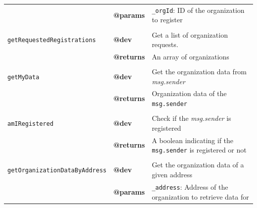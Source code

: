 \begin{table}[H]
{\begin{tabular}{lll}
                          & \textbf{@params}           & \texttt{\_orgId}: ID of the organization to register                                                                     \\
                          &                   &                                                                                                                \\ \hline
\texttt{getRequestedRegistrations} & \textbf{@dev}              & Get a list of organization requests.                                                                           \\
                          & \textbf{@returns}           & An array of organizations                                                                                          \\
                          &                   &                                                                                                                \\ \hline
\texttt{getMyData} &      \textbf{@dev}        & Get the organization data from \textit{msg.sender}                                                           \\
                          & \textbf{@returns}           & Organization data of the \texttt{msg.sender}                                                                     \\
                          &                   &                                                                                                                \\ \hline
\texttt{amIRegistered} &        \textbf{@dev}      & Check if the \textit{msg.sender} is registered                                                             \\
                          & \textbf{@returns}           & A boolean indicating if the \texttt{msg.sender} is registered or not                                                                      \\
                          &                   &                                                                                                                \\ \hline
\texttt{getOrganizationDataByAddress} &      \textbf{@dev}        & Get the organization data of a given address                                                                 \\
                          & \textbf{@params}           & \texttt{\_address}: Address of the organization to retrieve data for                                                           \\

\end{tabular}}
\end{table}
